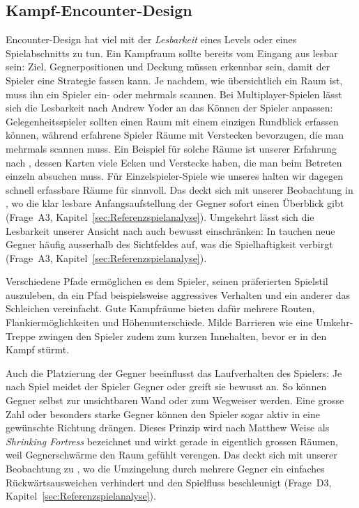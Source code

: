 \documentclass[../Main.tex]{subfiles}
\begin{document}
\subsection{Kampf-Encounter-Design} \label{sec:Encounter}
Encounter-Design hat viel mit der \textit{Lesbarkeit} eines Levels oder eines Spielabschnitts zu tun. Ein Kampfraum sollte bereits vom Eingang aus lesbar sein: Ziel, Gegnerpositionen und Deckung müssen erkennbar sein, damit der Spieler eine Strategie fassen kann.\autocite{gdc_horizonquests2018} Je nachdem, wie übersichtlich ein Raum ist, muss ihn ein Spieler ein- oder mehrmals scannen. Bei Multiplayer-Spielen lässt sich die Lesbarkeit nach Andrew Yoder an das Können der Spieler anpassen: Gelegenheitsspieler sollten einen Raum mit einem einzigen Rundblick erfassen können, während erfahrene Spieler Räume mit Verstecken bevorzugen, die man mehrmals scannen muss.\autocite[122--123]{totten2014architectural} Ein Beispiel für solche Räume ist unserer Erfahrung nach ,\autocite{valve_counterstrike_2000} dessen Karten viele Ecken und Verstecke haben, die man beim Betreten einzeln absuchen muss. Für Einzelspieler-Spiele wie unseres halten wir dagegen schnell erfassbare Räume für sinnvoll. Das deckt sich mit unserer Beobachtung in , wo die klar lesbare Anfangsaufstellung der Gegner sofort einen Überblick gibt (Frage~A3, Kapitel~\ref{sec:Referenzspielanalyse}). Umgekehrt lässt sich die Lesbarkeit unserer Ansicht nach auch bewusst einschränken: In  tauchen neue Gegner häufig ausserhalb des Sichtfeldes auf, was die Spielhaftigkeit verbirgt (Frage~A3, Kapitel~\ref{sec:Referenzspielanalyse}).

Verschiedene Pfade ermöglichen es dem Spieler, seinen präferierten Spielstil auszuleben, da ein Pfad beispielsweise aggressives Verhalten und ein anderer das Schleichen vereinfacht.\autocite{gdc_tenprinciples2010} Gute Kampfräume bieten dafür mehrere Routen, Flankiermöglichkeiten und Höhenunterschiede. Milde Barrieren wie eine Umkehr-Treppe zwingen den Spieler zudem zum kurzen Innehalten, bevor er in den Kampf stürmt.\autocite{gdc_horizonquests2018}

Auch die Platzierung der Gegner beeinflusst das Laufverhalten des Spielers: Je nach Spiel meidet der Spieler Gegner oder greift sie bewusst an. So können Gegner selbst zur unsichtbaren Wand oder zum Wegweiser werden.\autocite[199]{totten2014architectural} Eine grosse Zahl oder besonders starke Gegner können den Spieler sogar aktiv in eine gewünschte Richtung drängen. Dieses Prinzip wird nach Matthew Weise als \textit{Shrinking Fortress} bezeichnet und wirkt gerade in eigentlich grossen Räumen, weil Gegnerschwärme den Raum gefühlt verengen.\autocite[199--200]{totten2014architectural} Das deckt sich mit unserer Beobachtung zu , wo die Umzingelung durch mehrere Gegner ein einfaches Rückwärtsausweichen verhindert und den Spielfluss beschleunigt (Frage~D3, Kapitel~\ref{sec:Referenzspielanalyse}).
\end{document}
